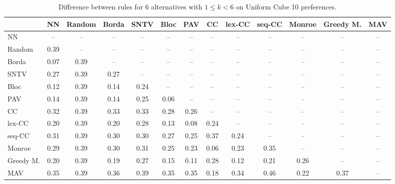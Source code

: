 
\begin{table*}[h!]
\centering
\begin{tabular}{lcccccccccccc}
\toprule
 & NN & Random & Borda & SNTV & Bloc & PAV & CC & lex-CC & seq-CC & Monroe & Greedy M. & MAV \\
\midrule
NN & -- & -- & -- & -- & -- & -- & -- & -- & -- & -- & -- & -- \\
Random & 0.39 & -- & -- & -- & -- & -- & -- & -- & -- & -- & -- & -- \\
Borda & 0.07 & 0.39 & -- & -- & -- & -- & -- & -- & -- & -- & -- & -- \\
SNTV & 0.27 & 0.39 & 0.27 & -- & -- & -- & -- & -- & -- & -- & -- & -- \\
Bloc & 0.12 & 0.39 & 0.14 & 0.24 & -- & -- & -- & -- & -- & -- & -- & -- \\
PAV & 0.14 & 0.39 & 0.14 & 0.25 & 0.06 & -- & -- & -- & -- & -- & -- & -- \\
CC & 0.32 & 0.39 & 0.33 & 0.33 & 0.28 & 0.26 & -- & -- & -- & -- & -- & -- \\
lex-CC & 0.20 & 0.39 & 0.20 & 0.28 & 0.13 & 0.08 & 0.24 & -- & -- & -- & -- & -- \\
seq-CC & 0.31 & 0.39 & 0.30 & 0.30 & 0.27 & 0.25 & 0.37 & 0.24 & -- & -- & -- & -- \\
Monroe & 0.29 & 0.39 & 0.30 & 0.31 & 0.25 & 0.23 & 0.06 & 0.23 & 0.35 & -- & -- & -- \\
Greedy M. & 0.20 & 0.39 & 0.19 & 0.27 & 0.15 & 0.11 & 0.28 & 0.12 & 0.21 & 0.26 & -- & -- \\
MAV & 0.35 & 0.39 & 0.36 & 0.39 & 0.35 & 0.35 & 0.18 & 0.34 & 0.46 & 0.22 & 0.37 & -- \\
\bottomrule
\end{tabular}

\caption{Difference between rules for 6 alternatives with $1 \leq k < 6$ on Uniform Cube 10 preferences.}
\end{table*}
